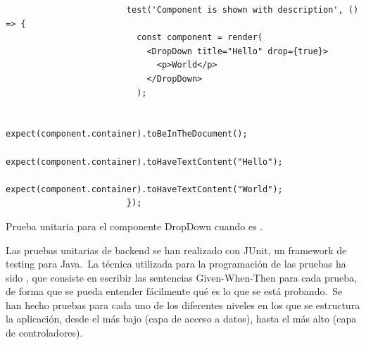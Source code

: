 \begin{codeBlock}
	\begin{verbatim}
						test('Component is shown with description', () => {
						  const component = render(
						    <DropDown title="Hello" drop={true}>
						      <p>World</p>
						    </DropDown>
						  );

						  expect(component.container).toBeInTheDocument();
						  expect(component.container).toHaveTextContent("Hello");
						  expect(component.container).toHaveTextContent("World");
						});
	\end{verbatim}
	\caption{Prueba unitaria para el componente DropDown cuando  es .}
	\label{code:prueba-unitaria-dropdown-true}
\end{codeBlock}


Las pruebas unitarias de backend se han realizado con JUnit, un framework de testing para Java.\ La técnica utilizada
para la programación de las pruebas ha sido , que consiste en escribir las
sentencias Given-When-Then para cada prueba, de forma que se pueda entender fácilmente qué es lo que se está
probando.\ Se han hecho pruebas para cada uno de los diferentes niveles en los que se estructura la aplicación, desde
el más bajo (capa de acceso a datos), hasta el más alto (capa de controladores).


